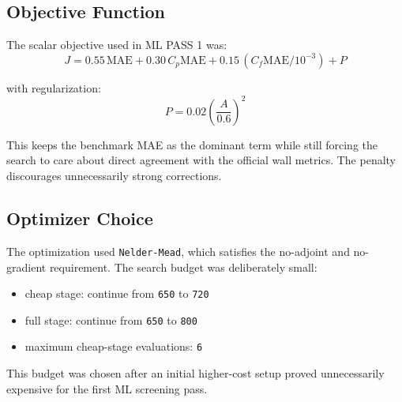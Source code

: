 \documentclass[11pt]{article}
\begin{document}
\subsection{Objective Function}
The scalar objective used in ML PASS 1 was:
\[
J = 0.55 \, \mathrm{MAE} + 0.30 \, C_p\mathrm{MAE} + 0.15 \, \left(C_f\mathrm{MAE}/10^{-3}\right) + P
\]

with regularization:
\[
P = 0.02 \left(\frac{A}{0.6}\right)^2
\]

This keeps the benchmark MAE as the dominant term while still forcing the search to care about direct agreement with the official wall metrics. The penalty discourages unnecessarily strong corrections.

\subsection{Optimizer Choice}
The optimization used \texttt{Nelder-Mead}, which satisfies the no-adjoint and no-gradient requirement. The search budget was deliberately small:
\begin{itemize}
\item cheap stage:
  continue from \texttt{650} to \texttt{720}
\item full stage:
  continue from \texttt{650} to \texttt{800}
\item maximum cheap-stage evaluations:
  \texttt{6}
\end{itemize}

This budget was chosen after an initial higher-cost setup proved unnecessarily expensive for the first ML screening pass.
\end{document}
